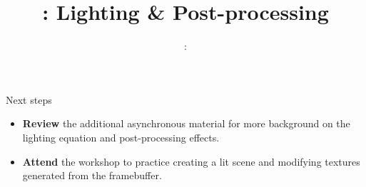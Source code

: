 \usepackage{../../beamerthemeFalmouthGamesAcademy}
\usepackage{multimedia}
\graphicspath{ {../../} }




\usepackage[normalem]{ulem}
\usepackage{wasysym}

\usepackage{pdfpages}

\usepackage{caption}
\captionsetup[figure]{font=scriptsize,labelfont=scriptsize}

\usetikzlibrary{arrows,automata}




\title{\sessionnumber: Lighting \& Post-processing}
\subtitle{\modulecode: \moduletitle}

\frame{\titlepage} 










\begin{frame}{Next steps}
	\begin{itemize}
		\item \textbf{Review} the additional asynchronous material for more background on the lighting equation and post-processing effects.
		\item \textbf{Attend} the workshop to practice creating a lit scene and modifying textures generated from the framebuffer.
	\end{itemize}
\end{frame}



